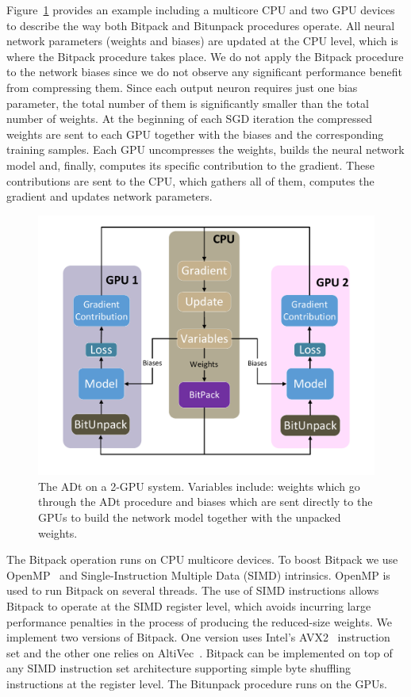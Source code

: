 Figure~\ref{bitpack_mgpu} provides an example including a multicore CPU and two GPU devices to describe the way both Bitpack and Bitunpack procedures operate.
All neural network parameters (weights and biases) are updated at the CPU level, which is where the Bitpack procedure takes place. 
We do not apply the Bitpack procedure to the network biases since we do not observe any significant performance benefit from compressing them.
Since each output neuron requires just one bias parameter, the total number of them is significantly smaller than the total number of weights.
At the beginning of each SGD iteration the compressed weights are sent to each GPU together with the biases and the corresponding training samples.
Each GPU uncompresses the weights, builds the neural network model  
and, finally, computes its specific contribution to the gradient.
These contributions are sent to the CPU, which gathers all of them, computes the gradient and updates network parameters.

\begin{figure}%
    \centerline{\includegraphics[scale=0.30]{figs/drawing6.pdf}}
        \caption{The ADt on a 2-GPU system. Variables include: weights which go through
    the ADt procedure and biases which are sent directly to the GPUs to build the
    network model together with the unpacked weights.}
        \label{bitpack_mgpu}
\end{figure}

The Bitpack operation runs on CPU multicore devices.
To boost Bitpack  
we use OpenMP~\cite{openmp} and 
Single-Instruction Multiple Data (SIMD) intrinsics.
OpenMP is used to run Bitpack on several threads.
The use of SIMD instructions allows Bitpack to operate at the SIMD register level, which
avoids incurring large performance penalties in the process of producing the reduced-size weights.
We implement two versions of Bitpack.
One version uses Intel's AVX2~\cite{avx} instruction set and the other one relies on AltiVec~\cite{Altivec}. 
Bitpack can be implemented on top of any SIMD instruction set architecture supporting simple byte shuffling instructions at the register level.
The Bitunpack procedure runs on the GPUs.

